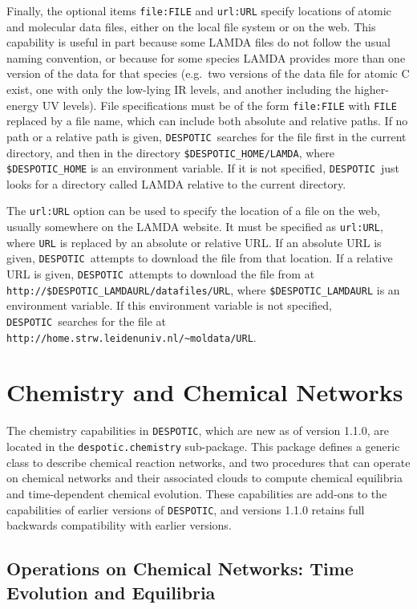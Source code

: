 \documentclass[12pt]{article}
\newcommand{\despotic}{\texttt{DESPOTIC}}
\begin{document}
Finally, the optional items \verb=file:FILE= and \verb=url:URL= specify locations of atomic and molecular data files, either on the local file system or on the web. This capability is useful in part because some LAMDA files do not follow the usual naming convention, or because for some species LAMDA provides more than one version of the data for that species (e.g.~two versions of the data file for atomic C exist, one with only the low-lying IR levels, and another including the higher-energy UV levels). File specifications must be of the form \verb=file:FILE= with \verb=FILE= replaced by a file name, which can include both absolute and relative paths. If no path or a relative path is given, \despotic\ searches for the file first in the current directory, and then in the directory \verb=$DESPOTIC_HOME/LAMDA=, where \verb=$DESPOTIC_HOME= is an environment variable. If it is not specified, \despotic\ just looks for a directory called LAMDA relative to the current directory.

The \verb=url:URL= option can be used to specify the location of a file on the web, usually somewhere on the LAMDA website. It must be specified as \verb=url:URL=, where \verb=URL= is replaced by an absolute or relative URL. If an absolute URL is given, \despotic\ attempts to download the file from that location. If a relative URL is given, \despotic\ attempts to download the file from at \verb=http://$DESPOTIC_LAMDAURL/datafiles/URL=, where \verb=$DESPOTIC_LAMDAURL= is an environment variable. If this environment variable is not specified, \despotic\ searches for the file at \verb=http://home.strw.leidenuniv.nl/~moldata/URL=.

\clearpage

\section{Chemistry and Chemical Networks}
\label{sec:chem}

The chemistry capabilities in \despotic, which are new as of version 1.1.0, are located in the \verb=despotic.chemistry= sub-package. This package defines a generic class to describe chemical reaction networks, and two procedures that can operate on chemical networks and their associated clouds to compute chemical equilibria and time-dependent chemical evolution. These capabilities are add-ons to the capabilities of earlier versions of \despotic, and versions 1.1.0 retains full backwards compatibility with earlier versions.

\subsection{Operations on Chemical Networks: Time Evolution and Equilibria}
\end{document}
